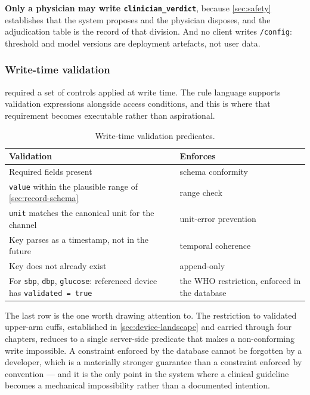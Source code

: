 \documentclass[12pt,a4paper,oneside]{report}
\begin{document}
\textbf{Only a physician may write \texttt{clinician\_verdict}}, because \cref{sec:safety} establishes that the system proposes and the physician disposes, and the adjudication table is the record of that division. And no client writes \texttt{/config}: threshold and model versions are deployment artefacts, not user data.

\subsubsection{Write-time validation}\label{sec:write-validation}

 required a set of controls applied at write time. The rule language supports validation expressions alongside access conditions, and this is where that requirement becomes executable rather than aspirational.

\begin{table}[htbp]
\centering\small
\caption{Write-time validation predicates.}\label{tab:write-validation}
\begin{tabularx}{\textwidth}{@{}>{\raggedright\arraybackslash}p{6.4cm} X@{}}
\toprule
\textbf{Validation} & \textbf{Enforces} \\
\midrule
Required fields present & schema conformity \\
\texttt{value} within the plausible range of \cref{sec:record-schema} & range check \\
\texttt{unit} matches the canonical unit for the channel & unit-error prevention \\
Key parses as a timestamp, not in the future & temporal coherence \\
Key does not already exist & append-only \\
For \texttt{sbp}, \texttt{dbp}, \texttt{glucose}: referenced device has \texttt{validated = true} & the WHO restriction, enforced in the database \\
\bottomrule
\end{tabularx}
\end{table}

The last row is the one worth drawing attention to. The restriction to validated upper-arm cuffs, established in \cref{sec:device-landscape} and carried through four chapters, reduces to a single server-side predicate that makes a non-conforming write impossible. A constraint enforced by the database cannot be forgotten by a developer, which is a materially stronger guarantee than a constraint enforced by convention --- and it is the only point in the system where a clinical guideline becomes a mechanical impossibility rather than a documented intention.
\end{document}
